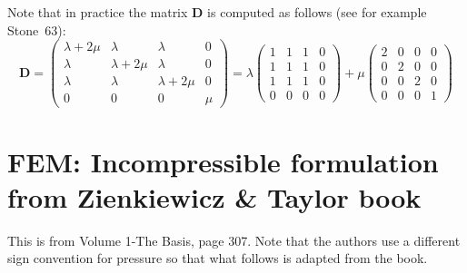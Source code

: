 

Note that in practice the matrix ${\bm D}$ is computed as follows (see for example Stone~63):
\[
{\bm D}
=
\left(
\begin{array}{cccc}
\lambda+2\mu & \lambda & \lambda & 0  \\
\lambda & \lambda+2\mu & \lambda & 0  \\
\lambda & \lambda & \lambda+2\mu & 0  \\
0 & 0 & 0 & \mu 
\end{array}
\right)
=
\lambda
\left(
\begin{array}{cccc}
1 & 1 & 1 & 0  \\
1 & 1 & 1 & 0  \\
1 & 1 & 1 & 0  \\
0 & 0 & 0 & 0 
\end{array}
\right)
+
\mu
\left(
\begin{array}{cccc}
2 & 0 & 0 & 0 \\
0 & 2 & 0 & 0 \\
0 & 0 & 2 & 0 \\
0 & 0 & 0 & 1  
\end{array}
\right)
\]




\newpage
\section{FEM: Incompressible formulation from Zienkiewicz \& Taylor book}

This is from Volume 1-The Basis, page 307. Note that the authors use a different sign convention for pressure so that what follows is adapted from the book.

